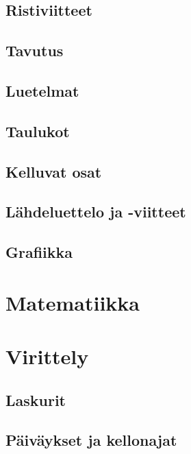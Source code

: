 \documentclass[a4paper,10pt,notitlepage,oneside]{book}
\begin{document}
\section{Ristiviitteet}
\section{Tavutus}
\section{Luetelmat}
\section{Taulukot}
\section{Kelluvat osat}
\section{Lähdeluettelo ja -viitteet}
\section{Grafiikka}

\chapter{Matematiikka}

\chapter{Virittely}
\section{Laskurit}
\section{Päiväykset ja kellonajat}
\end{document}
